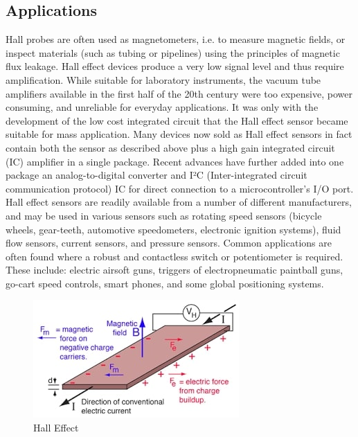 \documentclass[a4paper, 12pt]{article}
\begin{document}
\subsection{Applications}
Hall probes are often used as magnetometers, i.e. to measure magnetic fields, or inspect materials (such as tubing or pipelines) using the principles of magnetic flux leakage.
Hall effect devices produce a very low signal level and thus require amplification. While suitable for laboratory instruments, the vacuum tube amplifiers available in the first half of the 20th century were too expensive, power consuming, and unreliable for everyday applications. It was only with the development of the low cost integrated circuit that the Hall effect sensor became suitable for mass application. Many devices now sold as Hall effect sensors in fact contain both the sensor as described above plus a high gain integrated circuit (IC) amplifier in a single package. Recent advances have further added into one package an analog-to-digital converter and I²C (Inter-integrated circuit communication protocol) IC for direct connection to a microcontroller's I/O port.
Hall effect sensors are readily available from a number of different manufacturers, and may be used in various sensors such as rotating speed sensors (bicycle wheels, gear-teeth, automotive speedometers, electronic ignition systems), fluid flow sensors, current sensors, and pressure sensors. Common applications are often found where a robust and contactless switch or potentiometer is required. These include: electric airsoft guns, triggers of electropneumatic paintball guns, go-cart speed controls, smart phones, and some global positioning systems. \cite{weblink2}

\begin{figure}[h]
	{\begin{center}
		\includegraphics[scale=0.60]{ME20B004.jpg}
	\end{center}}
	\caption{Hall Effect \cite{pic}}
	\label{f1:image}
\end{figure}

  



\end{document}
